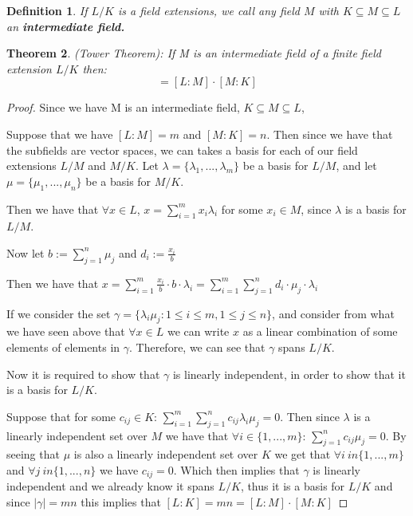 \documentclass[12pt]{article}
\newtheorem{theorem}{Theorem}
\newtheorem{definition}[theorem]{Definition}
\begin{document}
\begin{definition}
    If $L/K$ is a field extensions, we call any field $M$ with $K \subseteq M \subseteq L$ an \textbf{intermediate field.}
\end{definition}
\begin{theorem}
(Tower Theorem): If M is an intermediate field of a finite field extension $L/K$ then:
\begin{equation*}
    [L:K] = [L:M]\cdot[M:K]
\end{equation*}
\end{theorem}
\begin{proof}
Since we have M is an intermediate field, $K \subseteq M \subseteq L$,

Suppose that we have $[L:M]=m$ and $[M:K]=n$. Then since we have that the subfields are vector spaces, we can takes a basis for each of our field extensions $L/M$ and $M/K$.
Let $\lambda = \{\lambda_1,...,\lambda_m\}$ be a basis for $L/M$, and let $\mu = \{\mu_1,...,\mu_n\}$ be a basis for $M/K$.

\noindent Then we have that $\forall x \in L$, $x = \sum^m_{i=1}x_i\lambda_i$ for some $x_i \in M$, since $\lambda$ is a basis for $L/M$.

\noindent Now let $b:=\sum^n_{j=1}\mu_j$ and $d_i:=\frac{x_i}{b}$

\noindent Then we have that $x=\sum^m_{i=1}\frac{x_i}{b}\cdot b \cdot \lambda_i = \sum^m_{i=1}\sum^n_{j=1}d_i\cdot \mu_j \cdot \lambda_i$

\noindent If we consider the set $\gamma=\{\lambda_i\mu_j : 1\leq i \leq m, 1\leq j \leq n\}$, and consider from what we have seen above that $\forall x \in L$ we can write $x$ as a linear combination of some elements of elements in $\gamma$. Therefore, we can see that $\gamma$ spans $L/K$.

Now it is required to show that $\gamma$ is linearly independent, in order to show that it is a basis for $L/K$.

Suppose that for some $c_{ij} \in K$: $\sum^m_{i=1} \sum^n_{j=1} c_{ij}\lambda_i\mu_j = 0 $. Then since $\lambda$ is a linearly independent set over $M$ we have that $\forall i \in \{1,...,m\}$:\hspace{0.2cm} $\sum^n_{j=1} c_{ij}\mu_j = 0 $. By seeing that $\mu$ is also a linearly independent set over $K$ we get that $\forall i \ in \{1,...,m\}$ and $\forall j \ in \{1,...,n\}$ we have $c_{ij} = 0$. Which then implies that $\gamma$ is linearly independent and we already know it spans $L/K$, thus it is a basis for $L/K$ and since $|\gamma|=mn$ this implies that $[L:K] = mn = [L:M]\cdot[M:K]$

\end{proof}
\end{document}
